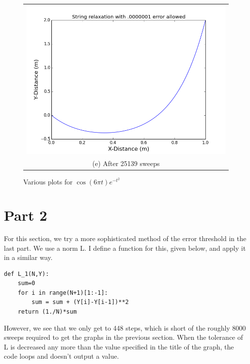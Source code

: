 \documentclass[11pt]{article}
\begin{document}
\begin{figure}[H]
\begin{tabular}{cc}
\multicolumn{2}{c}{\includegraphics[scale=.3]{1_relaxation(0000001).png}}\\
\multicolumn{2}{c}{(e) After 25139 sweeps} \\[6pt]
\end{tabular}
\caption{Various plots for $\cos (6\pi t) e^{-t^2} $}
\end{figure}

\section{Part 2}
For this section, we try a more sophisticated method of the error threshold in the last part. We use a norm L. I define a function for this, given below, and apply it in a similar way.
 
\begin{verbatim}
def L_1(N,Y):
    sum=0
    for i in range(N+1)[1:-1]:
        sum = sum + (Y[i]-Y[i-1])**2
    return (1./N)*sum
\end{verbatim}

However, we see that we only get to 448 steps, which is short of the roughly 8000 sweeps required to get the graphs in the previous section. When the tolerance of L is decreased any more than the value specified in the title of the graph, the code loops and doesn't output a value. 
\end{document}
